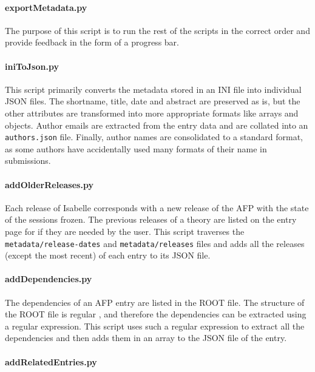 \documentclass[bsc,frontabs,oneside,singlespacing,parskip,deptreport,logo]{infthesis}
\begin{document}
\paragraph*{exportMetadata.py}

The purpose of this script is to run the rest of the scripts in the correct order and provide feedback in the form of a progress bar.

\paragraph*{iniToJson.py}

This script primarily converts the metadata stored in an INI file into individual JSON files. The shortname, title, date and abstract are preserved as is, but the other attributes are transformed into more appropriate formats like arrays and objects. Author emails are extracted from the entry data and are collated into an \texttt{authors.json} file. Finally, author names are consolidated to a standard format, as some authors have accidentally used many formats of their name in submissions.

\paragraph*{addOlderReleases.py}

Each release of Isabelle corresponds with a new release of the AFP with the state of the sessions frozen. The previous releases of a theory are listed on the entry page for if they are needed by the user. This script traverses the \verb|metadata/release-dates| and \verb|metadata/releases| files and adds all the releases (except the most recent) of each entry to its JSON file.

\paragraph*{addDependencies.py}

The dependencies of an AFP entry are listed in the ROOT file. The structure of the ROOT file is regular \cite{isabelle_system}, and therefore the dependencies can be extracted using a regular expression. This script uses such a regular expression to extract all the dependencies and then adds them in an array to the JSON file of the entry.

\paragraph*{addRelatedEntries.py}
\end{document}
